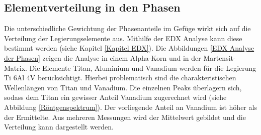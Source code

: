 \documentclass[a4paper, 11pt]{tubsreprt}
\begin{document}
\newpage

\subsection{Elementverteilung in den Phasen}
Die unterschiedliche Gewichtung der Phasenanteile im Gefüge wirkt sich auf die Verteilung der Legierungselemente aus. Mithilfe der EDX Analyse kann diese bestimmt werden (siehe Kapitel \ref{Kapitel EDX}). Die Abbildungen \ref{EDX Analyse der Phasen} zeigen die Analyse in einem Alpha-Korn und in der Martensit-Matrix. Die Elemente Titan, Aluminium und Vanadium werden für die Legierung Ti 6Al 4V berücksichtigt. Hierbei problematisch sind die charakteristischen Wellenlängen von Titan und Vanadium. Die einzelnen Peaks überlagern sich, sodass dem Titan ein gewisser Anteil Vanadium zugerechnet wird (siehe Abbildung \ref{Röntgenspektrum}). Der vorliegende Anteil an Vanadium ist höher als der Ermittelte. Aus mehreren Messungen wird der Mittelwert gebildet und die Verteilung kann dargestellt werden.
\end{document}
